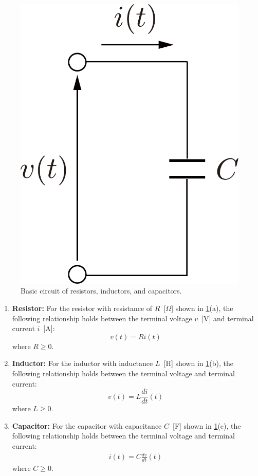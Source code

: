 \documentclass[graybox, envcountchap]{svmult}
\begin{document}
\begin{figure}[t]
{\begin{minipage}{0.3\linewidth}
      \subcaption{}
      \medskip
    \end{minipage}
    \begin{minipage}{0.3\linewidth}
      \centering
      \includegraphics[width = .7\linewidth]{figs/circcond}
      \subcaption{}
      \medskip
    \end{minipage}
  }
  \medskip
  \caption{\centering Basic circuit of resistors, inductors, and
  capacitors.}
  \label{fig:basiccirc} 
  \medskip
\end{figure}

\smallskip
\begin{enumerate}[label=(\alph*)]
  \item \textbf{Resistor:} For the resistor with resistance of $R$~[$\Omega$]
  shown in \ref{fig:basiccirc}(a), the following relationship holds between the
  terminal voltage $v$~[V] and terminal current $i$~[A]:
  \begin{equation}
    v(t) = R i(t)
  \end{equation}
  where $R\geq 0$.
  \bigskip
  \item \textbf{Inductor:} For the inductor with inductance $L$~[H] shown in
  \ref{fig:basiccirc}(b), the following relationship holds between the terminal
  voltage and terminal current:
  \begin{equation}
    v(t) = L \frac{di}{dt}(t)
  \end{equation}
  where $L\geq 0$.
  \bigskip
  \item \textbf{Capacitor:} For the capacitor with capacitance $C$~[F] shown in
  \ref{fig:basiccirc}(c), the following relationship holds between the terminal
  voltage and terminal current:
  \begin{align}
    i(t) = C \frac{dv}{dt}(t)
  \end{align}
  where $C\geq 0$.
\end{enumerate}
\end{document}
